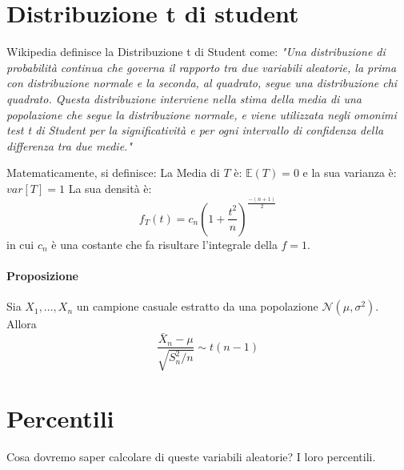 \section{Distribuzione t di student}
Wikipedia definisce la Distribuzione t di Student come:
\emph{
"Una distribuzione di probabilità continua che governa il rapporto tra due variabili aleatorie, 
la prima con distribuzione normale e la seconda, al quadrato, segue una distribuzione chi quadrato.
Questa distribuzione interviene nella stima della media di una popolazione che segue la distribuzione normale, 
e viene utilizzata negli omonimi test t di Student per la significatività e per ogni intervallo 
di confidenza della differenza tra due medie."
}

Matematicamente, si definisce:
La Media di $T$ è: $\mathbb{E}(T)=0$ e la sua varianza è: $var[T] = 1$
La sua densità è:
\[
    f_T(t) = c_n(1+\frac{t^2}{n})^{\frac{-(n+1)}{2}}
\]
in cui $c_n$ è una costante che fa risultare l'integrale della $f = 1$.
\paragraph*{Proposizione} Sia $X_1, ..., X_n$ un campione casuale estratto da
una popolazione $\mathcal{N}(\mu, \sigma^2)$. Allora
\[
    \frac{\bar{X}_n-\mu}{\sqrt{S^2_{n}/ n}} \sim t(n-1)
\]
\section{Percentili}
Cosa dovremo saper calcolare di queste variabili aleatorie? I loro percentili.


